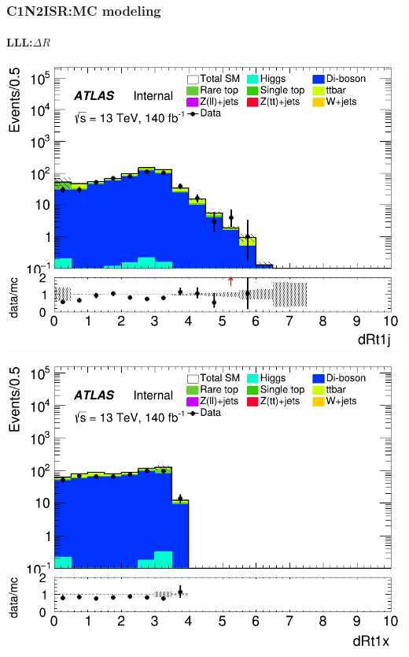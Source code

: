 \documentclass[usenames,dvipsnames]{beamer}
\begin{document}
\begin{frame}
\frametitle{C1N2ISR:MC modeling}
\framesubtitle{LLL:\quad $\Delta R$}
    \begin{minipage}{0.32\textwidth}
        \centering
        \includegraphics[width=\textwidth]{graphics/LLL_met/LLL_met_dRt1j.png}
    \end{minipage}
    \hfill
    \begin{minipage}{0.32\textwidth}
        \centering
        \includegraphics[width=\textwidth]{graphics/LLL_met/LLL_met_dRt1x.png}
    \end{minipage}
    \hfill
    \begin{minipage}{0.32\textwidth}
        \centering

\end{minipage}
\end{frame}
\end{document}
